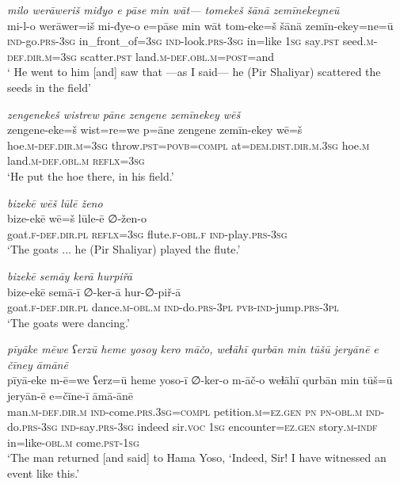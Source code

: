 \ea \label{ŽP.51}
\textit{milo werāweriš miđyo e pāse min wāt— tomekeš šānā zemīnekeyneū} \\ 
\gll mi-l-o werāwer=iš mi-đye-o e=pāse min wāt tom-eke=š šānā zemīn-ekey=ne=ū \\ 
 \textsc{ind-}go\textsc{.prs}\textsc{-3sg} in\_front\_of\textsc{=3sg} \textsc{ind-}look\textsc{.prs}\textsc{-3sg} in=like \textsc{1sg} say\textsc{.pst} seed\textsc{.m}\textsc{-def}\textsc{.dir}\textsc{.m}\textsc{=3sg} scatter\textsc{.pst} land\textsc{.m}\textsc{-def}\textsc{.obl}\textsc{.m}\textsc{=\textsc{post}}=and \\ 
\glt ` He went to him [and] saw that —as I said— he (Pir Shaliyar) scattered the seeds in the field'
\z 
 
\ea \label{ŽP.52}
\textit{zengenekeš wistrew pāne zengene zemīnekey wēš} \\ 
\gll zengene-eke=š wist=re=we p=āne zengene zemīn-ekey wē=š \\ 
 hoe\textsc{.m}\textsc{-def}\textsc{.dir}\textsc{.m}\textsc{=3sg} throw\textsc{.pst}\textsc{=\textsc{povb}}\textsc{=compl} at=\textsc{dem.dist}\textsc{.dir}\textsc{.m}\textsc{.3sg} hoe\textsc{.m} land\textsc{.m}\textsc{-def}\textsc{.obl}\textsc{.m} \textsc{reflx}\textsc{=3sg} \\ 
\glt `He put the hoe there, in his field.'
\z 
 
\ea \label{ŽP.54}
\textit{bizekē wēš lūlē ženo} \\ 
\gll bize-ekē wē=š lūle-ē ∅-žen-o \\ 
 goat\textsc{.f}\textsc{-def}\textsc{.dir}\textsc{.pl} \textsc{reflx}\textsc{=3sg} flute\textsc{.f}\textsc{-obl}\textsc{.f} \textsc{ind-}play\textsc{.prs}\textsc{-3sg} \\ 
\glt `The goats ... he (Pir Shaliyar) played the flute.'
\z 
 
\ea \label{ŽP.56}
\textit{bizekē semāy kerā hurpiřā} \\ 
\gll bize-ekē semā-ī ∅-ker-ā hur-∅-piř-ā \\ 
 goat\textsc{.f}\textsc{-def}\textsc{.dir}\textsc{.pl} dance\textsc{.m}\textsc{-obl}\textsc{.m} \textsc{ind-}do\textsc{.prs}\textsc{-3pl} \textsc{pvb-}\textsc{ind-}jump\textsc{.prs}\textsc{-3pl} \\ 
\glt `The goats were dancing.'
\z 
 
\ea \label{ŽP.57}
\textit{pīyāke mēwe ʕerzū heme yosoy kero māčo, weɫāhī qurbān min tūšū jeryānē e čīney āmānē} \\ 
\gll pīyā-eke m-ē=we ʕerz=ū heme yoso-ī ∅-ker-o m-āč-o weɫāhī qurbān min tūš=ū jeryān-ē e=čīne-ī āmā-ānē \\ 
 man\textsc{.m}\textsc{-def}\textsc{.dir}\textsc{.m} \textsc{ind-}come\textsc{.prs}\textsc{.3sg}\textsc{=compl} petition\textsc{.m}\textsc{\textsc{=ez.gen}} \textsc{pn} \textsc{pn}\textsc{-obl}\textsc{.m} \textsc{ind-}do\textsc{.prs}\textsc{-3sg} \textsc{ind-}say\textsc{.prs}\textsc{-3sg} indeed sir.\textsc{voc} \textsc{1sg} encounter\textsc{\textsc{=ez.gen}} story\textsc{.m}\textsc{-indf} in=like\textsc{-obl}\textsc{.m} come\textsc{.pst}\textsc{-\textsc{1sg}} \\ 
\glt `The man returned [and said] to Hama Yoso, ‘Indeed, Sir! I have witnessed an event like this.'
\z 
 
